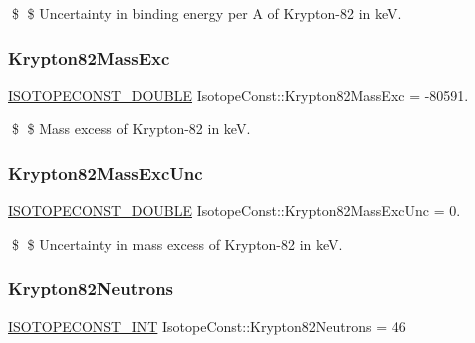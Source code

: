 \$ \$ Uncertainty in binding energy per A of Krypton-\/82 in keV. \mbox{\label{group___isotope_const-_krypton-_kr82_ga83d74d15d65a40f1a9b4c2a2b7cd0766}} 
\subsubsection{\texorpdfstring{Krypton82\+Mass\+Exc}{Krypton82MassExc}}
{\footnotesize\ttfamily \mbox{\hyperlink{group___isotope_const-_macros_ga8f45a7272ce02c0b4c65c44636ed719a}{I\+S\+O\+T\+O\+P\+E\+C\+O\+N\+S\+T\+\_\+\+D\+O\+U\+B\+LE}} Isotope\+Const\+::\+Krypton82\+Mass\+Exc = -\/80591.}

\$ \$ Mass excess of Krypton-\/82 in keV. \mbox{\label{group___isotope_const-_krypton-_kr82_ga0e4394f9c05953bf2085ed5707b43726}} 
\subsubsection{\texorpdfstring{Krypton82\+Mass\+Exc\+Unc}{Krypton82MassExcUnc}}
{\footnotesize\ttfamily \mbox{\hyperlink{group___isotope_const-_macros_ga8f45a7272ce02c0b4c65c44636ed719a}{I\+S\+O\+T\+O\+P\+E\+C\+O\+N\+S\+T\+\_\+\+D\+O\+U\+B\+LE}} Isotope\+Const\+::\+Krypton82\+Mass\+Exc\+Unc = 0.}

\$ \$ Uncertainty in mass excess of Krypton-\/82 in keV. \mbox{\label{group___isotope_const-_krypton-_kr82_gab70c9fc5b820d7cef83fd26ffd668d8c}} 
\subsubsection{\texorpdfstring{Krypton82\+Neutrons}{Krypton82Neutrons}}
{\footnotesize\ttfamily \mbox{\hyperlink{group___isotope_const-_macros_ga5f18360b3e99483a35c32d789e62621c}{I\+S\+O\+T\+O\+P\+E\+C\+O\+N\+S\+T\+\_\+\+I\+NT}} Isotope\+Const\+::\+Krypton82\+Neutrons = 46}

